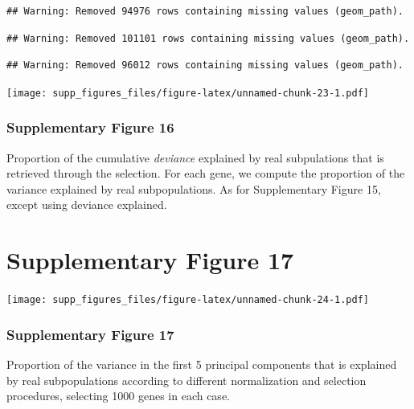 \documentclass[]{article}
\begin{document}
\begin{verbatim}
## Warning: Removed 94976 rows containing missing values (geom_path).
\end{verbatim}

\begin{verbatim}
## Warning: Removed 101101 rows containing missing values (geom_path).
\end{verbatim}

\begin{verbatim}
## Warning: Removed 96012 rows containing missing values (geom_path).
\end{verbatim}

\texttt{[image: supp\_figures\_files/figure-latex/unnamed-chunk-23-1.pdf]}

\hypertarget{supplementary-figure-16-1}{%
\subsubsection{Supplementary Figure
16}\label{supplementary-figure-16-1}}

Proportion of the cumulative \emph{deviance} explained by real
subpulations that is retrieved through the selection. For each gene, we
compute the proportion of the variance explained by real subpopulations.
As for Supplementary Figure 15, except using deviance explained.

\newpage

\hypertarget{supplementary-figure-17}{%
\section{Supplementary Figure 17}\label{supplementary-figure-17}}

\texttt{[image: supp\_figures\_files/figure-latex/unnamed-chunk-24-1.pdf]}

\hypertarget{supplementary-figure-17-1}{%
\subsubsection{Supplementary Figure
17}\label{supplementary-figure-17-1}}

Proportion of the variance in the first 5 principal components that is
explained by real subpopulations according to different normalization
and selection procedures, selecting 1000 genes in each case.

\newpage


\end{document}
